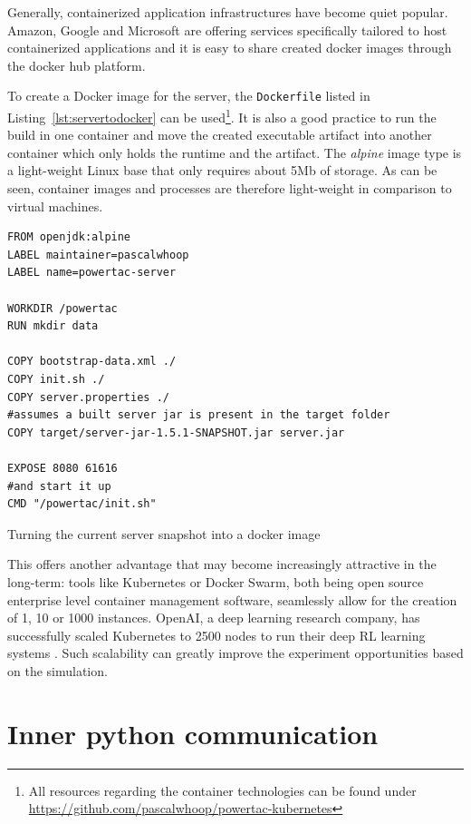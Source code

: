 Generally, containerized application infrastructures have become quiet popular. Amazon, Google and Microsoft are offering
services specifically tailored to host containerized applications and it is easy to share created docker images
through the docker hub platform.

To create a Docker image for the server, the \texttt{Dockerfile} listed in Listing~\ref{lst:servertodocker} can be
used\footnote{All resources regarding the container technologies can be found under
\url{https://github.com/pascalwhoop/powertac-kubernetes}}.
It is also a good practice to run the build in one container and move the created executable artifact into another
container which only holds the runtime and the artifact. The \emph{alpine} image type is a light-weight Linux base that
only requires about 5Mb of storage. As can be seen, container images and processes are therefore light-weight in
comparison to virtual machines.

\begin{listing}[h]

    \begin{verbatim}
FROM openjdk:alpine
LABEL maintainer=pascalwhoop
LABEL name=powertac-server

WORKDIR /powertac
RUN mkdir data

COPY bootstrap-data.xml ./
COPY init.sh ./
COPY server.properties ./
#assumes a built server jar is present in the target folder
COPY target/server-jar-1.5.1-SNAPSHOT.jar server.jar

EXPOSE 8080 61616
#and start it up
CMD "/powertac/init.sh"
    \end{verbatim}
    \caption{Turning the current server snapshot into a docker image}
    \label{lst:servertodocker}
\end{listing}

This offers another advantage that may become increasingly attractive in the long-term: tools like Kubernetes or Docker
Swarm, both being open source enterprise level container management software, seamlessly allow for the creation of 1, 10
or 1000 instances. OpenAI, a deep learning research company, has successfully scaled Kubernetes to 2500 nodes to run
their deep \ac{RL} learning systems \citep{openai2500}. Such scalability can greatly improve the experiment
opportunities based on the simulation.

\section{Inner python communication}%
\label{sub:inner_python_communication}


